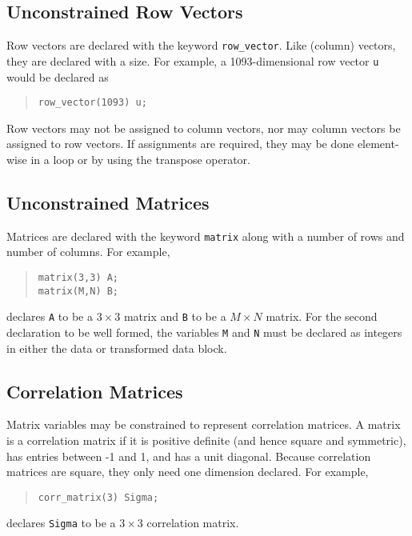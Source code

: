 \documentclass[10pt]{report}
\newcommand{\code}[1]{{\tt #1}}
\begin{document}
\subsection{Unconstrained Row Vectors}

Row vectors are declared with the keyword \code{row\_vector}.
Like (column) vectors, they are declared with a size.  For example,
a 1093-dimensional row vector \code{u} would be declared as
%
\begin{quote}
\begin{Verbatim}
row_vector(1093) u;
\end{Verbatim}
\end{quote}
%

Row vectors may not be assigned to column vectors, nor may column
vectors be assigned to row vectors.  If assignments are required, they
may be done element-wise in a loop or by using the transpose operator.

\subsection{Unconstrained Matrices}

Matrices are declared with the keyword \code{matrix} along with a
number of rows and number of columns.  For example, 
%
\begin{quote}
\begin{Verbatim}  
matrix(3,3) A;  
matrix(M,N) B;
\end{Verbatim}
\end{quote}
%  
declares \code{A} to be a $3 \times 3$ matrix and \code{B} to be a $M
\times N$ matrix.  For the second declaration to be well formed, the
variables \code{M} and \code{N} must be declared as integers in either
the data or transformed data block.

\subsection{Correlation Matrices}

Matrix variables may be constrained to represent correlation matrices.
A matrix is a correlation matrix if it is positive definite (and hence
square and symmetric), has entries between -1 and 1, and has a unit
diagonal.  Because correlation matrices are square, they only need one
dimension declared.  For example,
%
\begin{quote}
\begin{Verbatim} 
corr_matrix(3) Sigma;
\end{Verbatim}
\end{quote}
% 
declares \code{Sigma} to be a $3 \times 3$ correlation matrix.
\end{document}
